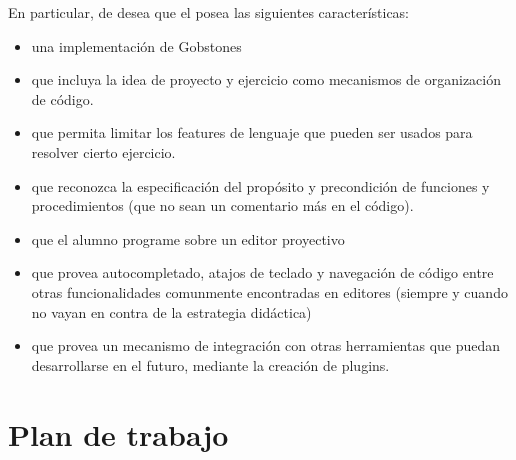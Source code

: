 En particular, de desea que el \ile posea las siguientes características:

\begin{itemize}
  \item una implementación de Gobstones
  \item que incluya la idea de proyecto y ejercicio como mecanismos de organización de código.
  \item que permita limitar los features de lenguaje que pueden ser usados para resolver cierto ejercicio.
  \item que reconozca la especificación del propósito y precondición de funciones y procedimientos (que no sean un comentario más en el código).
  \item que el alumno programe sobre un editor proyectivo
  \item que provea autocompletado, atajos de teclado y navegación de código entre otras funcionalidades comunmente encontradas en editores (siempre y cuando no vayan en contra de la estrategia didáctica)
  \item que provea un mecanismo de integración con otras herramientas que puedan desarrollarse en el futuro, mediante la creación de plugins.
\end{itemize}

\section{Plan de trabajo}

